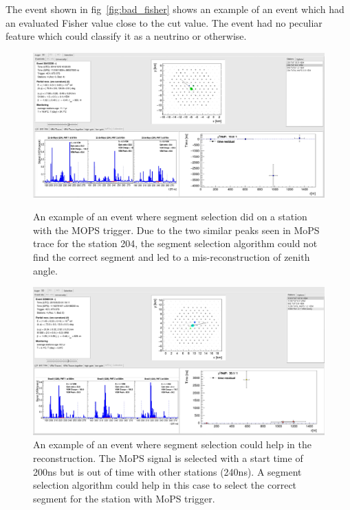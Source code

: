 The event shown in fig~\ref{fig:bad_fisher} shows an example of an event which had an evaluated Fisher value close to the cut value. The event had no peculiar feature which could classify it as a neutrino or otherwise.

\begin{figure}[h!]
  \centering
  \includegraphics[width=\textwidth]{thesis_figures/App3/Bad_segment.pdf}
  \caption{An example of an event where segment selection did on a station with the MOPS trigger. Due to the two similar peaks seen in MoPS trace for the station 204, the segment selection algorithm could not find the correct segment and led to a mis-reconstruction of zenith angle.}
  \label{fig:bad_segment_selection}
  \includegraphics[width=\textwidth]{thesis_figures/App3/MoPS_peak_selection.pdf}
  \caption{An example of an event where segment selection could help in the reconstruction. The MoPS signal is selected with a start time of 200ns but is out of time with other stations (240ns). A segment selection algorithm could help in this case to select the correct segment for the station with MoPS trigger.}
  \label{fig:good_segment_selection}

\end{figure}

